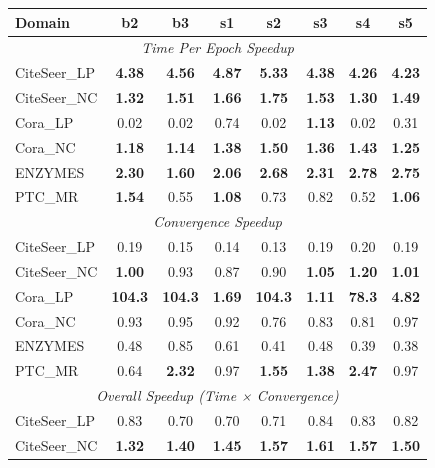 \documentclass[11pt]{article}
\begin{document}
\begin{table}[t]
\centering
\footnotesize
\setlength{\tabcolsep}{2.6pt}
\renewcommand{\arraystretch}{1.05}
\begin{tabular}{l c c c c c c c}
\toprule
\textbf{Domain} & \textbf{b2} & \textbf{b3} & \textbf{s1} & \textbf{s2} & \textbf{s3} & \textbf{s4} & \textbf{s5} \\
\midrule
\multicolumn{8}{c}{\textit{Time Per Epoch Speedup}} \\
CiteSeer\_LP & \textbf{4.38} & \textbf{4.56} & \textbf{4.87} & \textbf{5.33} & \textbf{4.38} & \textbf{4.26} & \textbf{4.23} \\
CiteSeer\_NC & \textbf{1.32} & \textbf{1.51} & \textbf{1.66} & \textbf{1.75} & \textbf{1.53} & \textbf{1.30} & \textbf{1.49} \\
Cora\_LP & 0.02 & 0.02 & 0.74 & 0.02 & \textbf{1.13} & 0.02 & 0.31 \\
Cora\_NC & \textbf{1.18} & \textbf{1.14} & \textbf{1.38} & \textbf{1.50} & \textbf{1.36} & \textbf{1.43} & \textbf{1.25} \\
ENZYMES & \textbf{2.30} & \textbf{1.60} & \textbf{2.06} & \textbf{2.68} & \textbf{2.31} & \textbf{2.78} & \textbf{2.75} \\
PTC\_MR & \textbf{1.54} & 0.55 & \textbf{1.08} & 0.73 & 0.82 & 0.52 & \textbf{1.06} \\
\midrule
\multicolumn{8}{c}{\textit{Convergence Speedup}} \\
CiteSeer\_LP & 0.19 & 0.15 & 0.14 & 0.13 & 0.19 & 0.20 & 0.19 \\
CiteSeer\_NC & \textbf{1.00} & 0.93 & 0.87 & 0.90 & \textbf{1.05} & \textbf{1.20} & \textbf{1.01} \\
Cora\_LP & \textbf{104.3} & \textbf{104.3} & \textbf{1.69} & \textbf{104.3} & \textbf{1.11} & \textbf{78.3} & \textbf{4.82} \\
Cora\_NC & 0.93 & 0.95 & 0.92 & 0.76 & 0.83 & 0.81 & 0.97 \\
ENZYMES & 0.48 & 0.85 & 0.61 & 0.41 & 0.48 & 0.39 & 0.38 \\
PTC\_MR & 0.64 & \textbf{2.32} & 0.97 & \textbf{1.55} & \textbf{1.38} & \textbf{2.47} & 0.97 \\
\midrule
\multicolumn{8}{c}{\textit{Overall Speedup (Time × Convergence)}} \\
CiteSeer\_LP & 0.83 & 0.70 & 0.70 & 0.71 & 0.84 & 0.83 & 0.82 \\
CiteSeer\_NC & \textbf{1.32} & \textbf{1.40} & \textbf{1.45} & \textbf{1.57} & \textbf{1.61} & \textbf{1.57} & \textbf{1.50} \\

\end{tabular}
\end{table}
\end{document}
